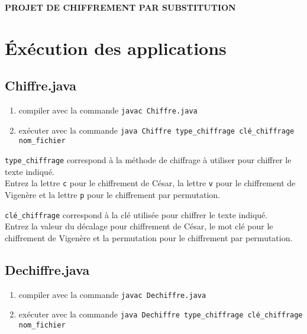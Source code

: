 \documentclass{article}
\begin{document}
\textbf{PROJET DE CHIFFREMENT PAR SUBSTITUTION}

\flushleft
\color{black}

\color{cyan}\section{Éxécution des applications}
\color{black}
\vspace{1\baselineskip}

\subsection{Chiffre.java}
\vspace{1\baselineskip}

\begin{enumerate}
\item compiler avec la commande \texttt{javac Chiffre.java}
\item exécuter avec la commande \texttt{java Chiffre type\_chiffrage clé\_chiffrage nom\_fichier}
\end{enumerate}
\vspace{1\baselineskip}

\texttt{type\_chiffrage} correspond à la méthode de chiffrage à utiliser pour chiffrer le texte indiqué. \\
Entrez la lettre \texttt{c} pour le chiffrement de César, la lettre \texttt{v} pour le chiffrement de Vigenère et la lettre \texttt{p} pour le chiffrement par permutation. \\
\vspace{1\baselineskip}

\texttt{clé\_chiffrage} correspond à la clé utilisée pour chiffrer le texte indiqué. \\
Entrez la valeur du décalage pour chiffrement de César, le mot clé pour le chiffrement de Vigenère et la permutation pour le chiffrement par permutation. \\
\vspace{2\baselineskip}

\subsection{Dechiffre.java}
\vspace{1\baselineskip}

\begin{enumerate}
\item compiler avec la commande \texttt{javac Dechiffre.java}
\item exécuter avec la commande \texttt{java Dechiffre type\_chiffrage clé\_chiffrage nom\_fichier}
\end{enumerate}
\vspace{1\baselineskip}
\end{document}
